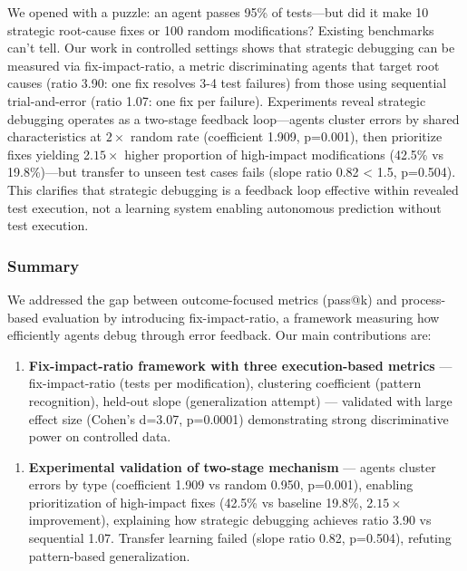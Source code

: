 
We opened with a puzzle: an agent passes 95\% of tests---but did it make 10 strategic root-cause fixes or 100 random modifications? Existing benchmarks can't tell. Our work in controlled settings shows that strategic debugging can be measured via fix-impact-ratio, a metric discriminating agents that target root causes (ratio 3.90: one fix resolves 3-4 test failures) from those using sequential trial-and-error (ratio 1.07: one fix per failure). Experiments reveal strategic debugging operates as a two-stage feedback loop---agents cluster errors by shared characteristics at $2\times$ random rate (coefficient 1.909, p=0.001), then prioritize fixes yielding 2.$15\times$ higher proportion of high-impact modifications (42.5\% vs 19.8\%)---but transfer to unseen test cases fails (slope ratio 0.82 < 1.5, p=0.504). This clarifies that strategic debugging is a feedback loop effective within revealed test execution, not a learning system enabling autonomous prediction without test execution.

\subsubsection{Summary}

We addressed the gap between outcome-focused metrics (pass@k) and process-based evaluation by introducing fix-impact-ratio, a framework measuring how efficiently agents debug through error feedback. Our main contributions are:

\begin{enumerate}
\item \textbf{Fix-impact-ratio framework with three execution-based metrics} --- fix-impact-ratio (tests per modification), clustering coefficient (pattern recognition), held-out slope (generalization attempt) --- validated with large effect size (Cohen's d=3.07, p=0.0001) demonstrating strong discriminative power on controlled data.
\end{enumerate}

\begin{enumerate}
\item \textbf{Experimental validation of two-stage mechanism} --- agents cluster errors by type (coefficient 1.909 vs random 0.950, p=0.001), enabling prioritization of high-impact fixes (42.5\% vs baseline 19.8\%, 2.$15\times$ improvement), explaining how strategic debugging achieves ratio 3.90 vs sequential 1.07. Transfer learning failed (slope ratio 0.82, p=0.504), refuting pattern-based generalization.
\end{enumerate}

